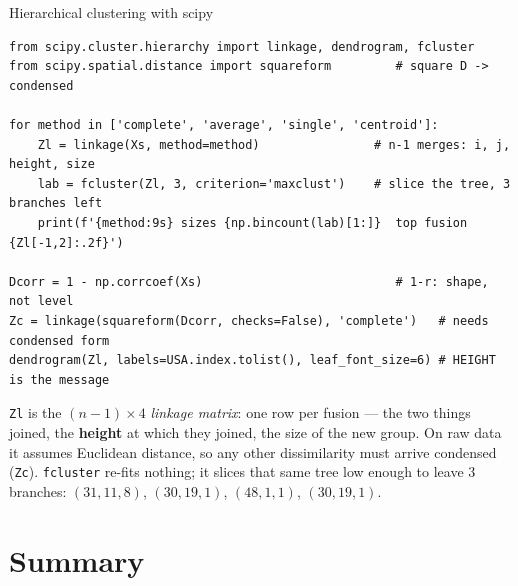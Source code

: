 \documentclass[aspectratio=169,11pt]{beamer}
\begin{document}
\begin{frame}[fragile]{Hierarchical clustering with scipy}
  \begin{lstlisting}
from scipy.cluster.hierarchy import linkage, dendrogram, fcluster
from scipy.spatial.distance import squareform         # square D -> condensed

for method in ['complete', 'average', 'single', 'centroid']:
    Zl = linkage(Xs, method=method)                # n-1 merges: i, j, height, size
    lab = fcluster(Zl, 3, criterion='maxclust')    # slice the tree, 3 branches left
    print(f'{method:9s} sizes {np.bincount(lab)[1:]}  top fusion {Zl[-1,2]:.2f}')

Dcorr = 1 - np.corrcoef(Xs)                           # 1-r: shape, not level
Zc = linkage(squareform(Dcorr, checks=False), 'complete')   # needs condensed form
dendrogram(Zl, labels=USA.index.tolist(), leaf_font_size=6) # HEIGHT is the message
  \end{lstlisting}
  \footnotesize
  \begin{readme}
    \texttt{Zl} is the $(n-1)\times4$ \emph{linkage matrix}: one row per fusion --- the two
    things joined, the \textbf{height} at which they joined, the size of the new group. On
    raw data it assumes Euclidean distance, so any other dissimilarity must arrive
    condensed (\texttt{Zc}). \texttt{fcluster} re-fits nothing; it slices that same tree
    low enough to leave $3$ branches: $(31,11,8)$, $(30,19,1)$, $(48,1,1)$, $(30,19,1)$.
  \end{readme}
\end{frame}

\section{Summary}
\end{document}
